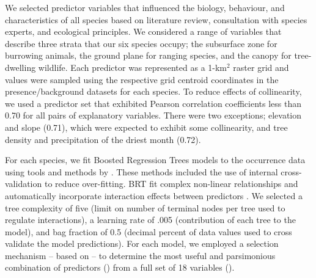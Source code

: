 We selected predictor variables that influenced the biology, behaviour, and characteristics of all species based on literature review, consultation with species experts, and ecological principles. We considered a range of variables that describe three strata that our six species occupy; the subsurface zone for burrowing animals, the ground plane for ranging species, and the canopy for tree-dwelling wildlife. Each predictor was represented as a 1-km$^2$ raster grid and values were sampled using the respective grid centroid coordinates in the presence/background datasets for each species. To reduce effects of collinearity, we used a predictor set that exhibited Pearson correlation coefficients less than 0.70 for all pairs of explanatory variables. There were two exceptions; elevation and slope (0.71), which were expected to exhibit some collinearity, and tree density and precipitation of the driest month (0.72).

For each species, we fit Boosted Regression Trees \citep[BRT, see][]{frie02} models to the occurrence data using tools and methods by \cite{elit08}. These methods included the use of internal cross-validation to reduce over-fitting. BRT fit complex non-linear relationships and automatically incorporate interaction effects between predictors \citep{elit09}. We selected a tree complexity of five (limit on number of terminal nodes per tree used to regulate interactions), a learning rate of .005 (contribution of each tree to the model), and bag fraction of 0.5 (decimal percent of data values used to cross validate the model predictions). For each model, we employed a selection mechanism -- based on \cite{elit08} -- to determine the most useful and parsimonious combination of predictors () from a full set of 18 variables ().

